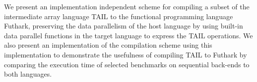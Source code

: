 \documentclass[11pt]{article}
\begin{document}

\clearpage\maketitle
\thispagestyle{empty}

\newpage

\abstract

We present an implementation independent scheme for compiling a subset of the intermediate array language TAIL
 to the functional programming language Futhark, 
 preserving the data parallelism of the host language by using built-in data parallel functions in the target language to express the TAIL operations. We also present an implementation of the compilation scheme using this implementation to demonstrate the usefulness of compiling TAIL to Futhark by comparing the execution time of selected benchmarks on sequential back-ends to both languages. \\\\\\\\\\\\\\\\\\\\\\\\
\end{document}
